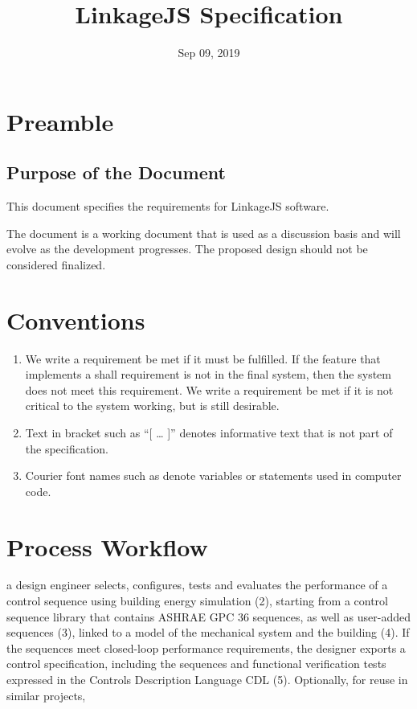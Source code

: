 \documentclass[letterpaper,10pt, openany,english]{sphinxmanual}
\title{LinkageJS Specification}
\date{Sep 09, 2019}
\author{}
\begin{document}
\pagestyle{empty}
\sphinxmaketitle
\pagestyle{plain}
\sphinxtableofcontents
\pagestyle{normal}
\label{\detokenize{index::doc}}


\pagestyle{plain}


\chapter{Preamble}
\label{\detokenize{preamble:preamble}}\label{\detokenize{preamble::doc}}

\section{Purpose of the Document}
\label{\detokenize{preamble:purpose-of-the-document}}
This document specifies the requirements for LinkageJS software.

The document is a working document that is used as a discussion basis and will evolve as the development progresses.
The proposed design should not be considered finalized.


\chapter{Conventions}
\label{\detokenize{conventions:conventions}}\label{\detokenize{conventions:sec-conventions}}\label{\detokenize{conventions::doc}}\begin{enumerate}
%
\item {} 
We write a requirement  be met if it must be fulfilled.
If the feature that implements a shall requirement is not in the final system,
then the system does not meet this requirement.
We write a requirement  be met if it is not critical
to the system working, but is still desirable.

\item {} 
Text in bracket such as “{[} … {]}” denotes informative text that is
not part of the specification.

\item {} 
Courier font names such as  denote variables or statements used in computer code.

\end{enumerate}


\chapter{Process Workflow}
\label{\detokenize{process:process-workflow}}\label{\detokenize{process:sec-process}}\label{\detokenize{process::doc}}
a design engineer selects, configures, tests and evaluates the performance of a control sequence
using building energy simulation (2),
starting from a control sequence library that contains ASHRAE GPC 36 sequences,
as well as user-added sequences (3),
linked to a model of the mechanical system and the building (4).
If the sequences meet closed-loop performance requirements,
the designer exports a control specification,
including the sequences and functional verification tests expressed in
the Controls Description Language CDL (5).
Optionally, for reuse in similar projects,
\end{document}
